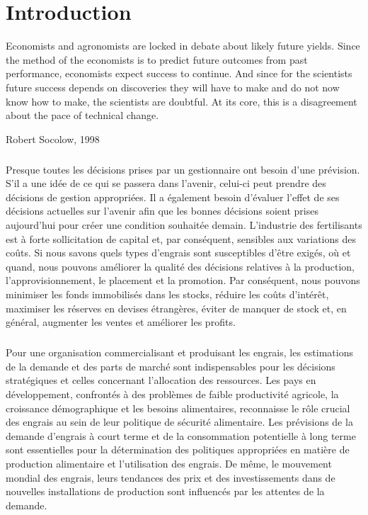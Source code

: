 \chapter*{Introduction}
\epigraph{Economists and agronomists are locked in debate about likely
future yields. Since the method of the economists is to predict
future outcomes from past performance, economists expect
success to continue. And since for the scientists future success
depends on discoveries they will have to make and do not now
know how to make, the scientists are doubtful. At its core, this is
a disagreement about the pace of technical change.}{Robert
Socolow, 1998}
\paragraph{}
Presque toutes les décisions prises par un gestionnaire ont besoin d'une prévision. S'il a une idée de ce qui se passera dans l'avenir, celui-ci peut prendre des décisions de gestion appropriées. Il a également besoin d'évaluer l'effet de ses décisions actuelles sur l'avenir afin que les bonnes décisions soient prises aujourd'hui pour créer une condition souhaitée demain. L’industrie des fertilisants est à forte sollicitation de capital et, par conséquent, sensibles aux variations des coûts. Si nous savons quels types d'engrais sont susceptibles d'être exigés, où et quand, nous pouvons améliorer la qualité des décisions relatives à la production, l'approvisionnement, le placement et la promotion. Par conséquent, nous pouvons minimiser les fonds immobilisés dans les stocks, réduire les coûts d'intérêt, maximiser les réserves en devises étrangères, éviter de manquer de stock et, en général, augmenter les ventes et améliorer les profits.
\paragraph{}
Pour une organisation commercialisant et produisant les engrais, les estimations de la demande et des parts de marché sont indispensables pour les décisions stratégiques et celles concernant l'allocation des ressources. Les pays en développement, confrontés à des problèmes de faible productivité agricole, la croissance démographique et les besoins alimentaires, reconnaisse le rôle crucial des engrais au sein de leur politique de sécurité alimentaire. Les prévisions de la demande d'engrais à court terme et de la consommation potentielle à long terme sont essentielles pour la détermination des politiques appropriées en matière de production alimentaire et l'utilisation des engrais. De même, le mouvement mondial des engrais, leurs tendances des prix et des investissements dans de nouvelles installations de production sont influencés par les attentes de la demande.
